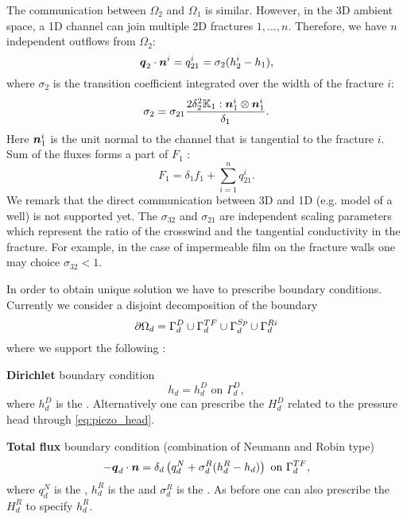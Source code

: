 The communication between $\Omega_2$  and  $\Omega_1$ is similar.  However, in the 3D ambient space,
a 1D channel can join multiple 2D fractures $1,\dots, n$. Therefore, we have $n$
independent outflows from $\Omega_2$:
\begin{equation*}
        \mathbf{\boldsymbol{q}}_2\cdot \mathbf{\boldsymbol{n}}^{i} = q_{21}^{i} =\sigma_{2} (h_2^{i}-h_1),
\end{equation*}
where $\sigma_2$  is the transition coefficient integrated over the width of the fracture $i$:
\[
\label{e:sigma2_law}
  \sigma_2 = \sigma_{21} \frac{2\delta_2^2\tn K_1:{\vc n_1^i}\otimes{\vc n_1^i}}{\delta_1}.
\]
Here $\mathbf{\boldsymbol{n}}_1^i$ is the unit normal to the channel that is tangential to the fracture $i$.
Sum of the fluxes forms a part of $F_1$ :
\begin{equation}
   \label{source_1D}
   F_1 = \delta_1 f_1 + \sum_{i=1}^n q_{21}^{i}. 
\end{equation}
We remark that the direct communication between 3D and 1D (e.g. model of a well) is not supported yet.
The  
{$\sigma_{32}$} \units{}{}{} and
{$\sigma_{21}$} \units{}{}{} are independent scaling parameters which represent 
the ratio of the crosswind and the tangential conductivity in the fracture. For example, in the case of impermeable film
on the fracture walls one may choice $\sigma_{32} < 1$.


In order to obtain unique solution we have to prescribe boundary conditions.
Currently we consider a disjoint decomposition of the boundary
\[
    \partial\Omega_d = \Gamma_d^D \cup \Gamma_d^{TF} \cup \Gamma_d^{Sp} \cup \Gamma_d^{Ri}
\]
where we support the following
:

{\bf Dirichlet} boundary condition
\[
    h_d = h_d^D        \text{ on }\Gamma_d^D,
\]
where $h_d^D$  is the  .
Alternatively one can prescribe the 
$H_d^D$  related to the pressure head through \eqref{eq:piezo_head}.

{\bf Total flux} boundary condition (combination of Neumann and Robin type)
\[
    -\mathbf{\boldsymbol{q}}_d \cdot \mathbf{\boldsymbol{n}} = \delta_d\left(q_d^N + \sigma_d^R ( h_d^R - h_d)\right)        \text{ on }\Gamma_d^{TF},
\]
where $q_d^N$  is the ,
$h_d^R$  is the  and
$\sigma_d^R$   
is the .
As before one can also prescribe the 
$H_d^R$ to specify $h_d^R$.

